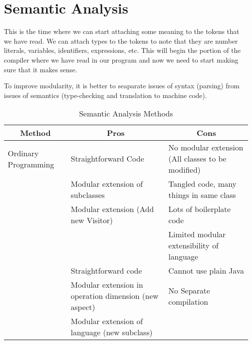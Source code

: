 \section{Semantic Analysis}\label{sec:Semantic_Analysis}
This is the time where we can start attaching some meaning to the tokens that we have read.
We can attach types to the tokens to note that they are number literals, variables, identifiers, expressions, etc.
This will begin the portion of the compiler where we have read in our program and now we need to start making sure that it makes sense.

To improve modularity, it is better to seaparate issues of syntax (parsing) from issues of semantics (type-checking and translation to machine code).

\begin{table}[h!]
  \centering
  \begin{tabular}{p{3.0cm}p{5.0cm}p{5.0cm}}
    \toprule
    \multicolumn{1}{c}{Method} & \multicolumn{1}{c}{Pros} & \multicolumn{1}{c}{Cons} \\
    \midrule
    Ordinary Programming & Straightforward Code & No modular extension (All classes to be modified) \\
           & Modular extension of subclasses & Tangled code, many things in same class \\
    \midrule
    \nameref{def:Visitors} & Modular extension (Add new Visitor) & Lots of boilerplate code \\
           & & Limited modular extensibility of language \\
    \midrule
    \nameref{def:Aspect_Oriented_Programming} & Straightforward code & Cannot use plain Java \\
           & Modular extension in operation dimension (new aspect) & No Separate compilation \\
    & Modular extension of language (new subclass) & \\
    \bottomrule
  \end{tabular}
  \caption{Semantic Analysis Methods}
  \label{tab:Semantic_Analysis_Methods}
\end{table}

